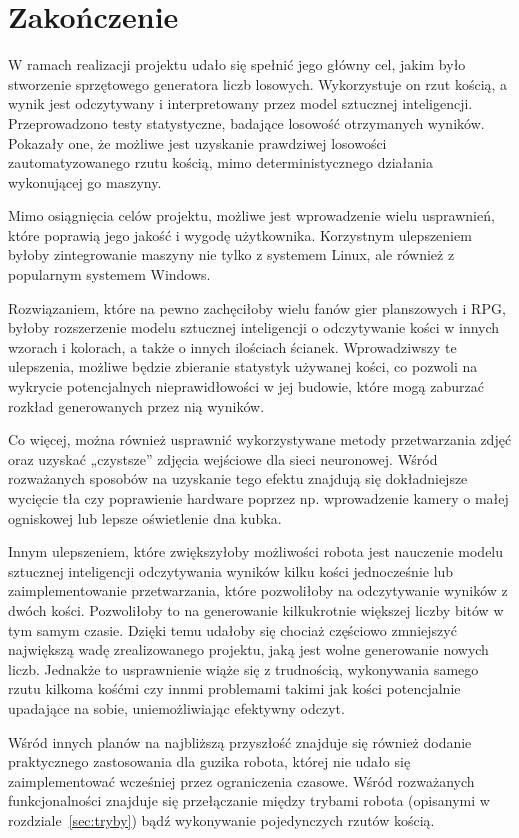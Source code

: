 
\chapter{Zakończenie}\label{ch:zakonczenie}

W ramach realizacji projektu udało się spełnić jego główny cel, jakim było stworzenie sprzętowego generatora liczb losowych.
Wykorzystuje on rzut kością, a wynik jest odczytywany i interpretowany przez model sztucznej inteligencji. Przeprowadzono
testy statystyczne, badające losowość otrzymanych wyników. Pokazały one, że możliwe jest uzyskanie prawdziwej losowości 
zautomatyzowanego rzutu kością, mimo deterministycznego działania wykonującej go maszyny.

Mimo osiągnięcia celów projektu, możliwe jest wprowadzenie wielu usprawnień, które poprawią jego jakość i wygodę użytkownika.
Korzystnym ulepszeniem byłoby zintegrowanie maszyny nie tylko z systemem Linux, ale również z popularnym systemem Windows.

Rozwiązaniem, które na pewno zachęciłoby wielu fanów gier planszowych i RPG, byłoby rozszerzenie modelu 
sztucznej inteligencji o odczytywanie kości w innych wzorach i kolorach, a także o innych ilościach ścianek.
Wprowadziwszy te ulepszenia, możliwe będzie zbieranie statystyk używanej kości, co pozwoli na wykrycie
potencjalnych nieprawidłowości w jej budowie, które mogą zaburzać rozkład generowanych przez nią wyników.

Co więcej, można również usprawnić wykorzystywane metody przetwarzania zdjęć oraz uzyskać
„czystsze” zdjęcia wejściowe dla sieci neuronowej. Wśród rozważanych sposobów na uzyskanie tego efektu znajdują się
dokładniejsze wycięcie tła czy poprawienie hardware poprzez np. wprowadzenie kamery o małej ogniskowej lub
lepsze oświetlenie dna kubka.

Innym ulepszeniem, które zwiększyłoby możliwości robota jest nauczenie modelu sztucznej inteligencji odczytywania
wyników kilku kości jednocześnie lub zaimplementowanie przetwarzania, które pozwoliłoby na odczytywanie wyników z dwóch kości.
Pozwoliłoby to na generowanie kilkukrotnie większej liczby bitów w tym samym czasie.
Dzięki temu udałoby się chociaż częściowo zmniejszyć największą wadę zrealizowanego projektu,
jaką jest wolne generowanie nowych liczb.
Jednakże to usprawnienie wiąże się z trudnością, wykonywania samego rzutu kilkoma kośćmi czy innmi problemami takimi jak kości potencjalnie 
upadające na sobie, uniemożliwiając efektywny odczyt.

Wśród innych planów na najbliższą przyszłość znajduje się również dodanie praktycznego zastosowania dla guzika robota,
której nie udało się zaimplementować wcześniej przez ograniczenia czasowe. Wśród rozważanych funkcjonalności znajduje się
przełączanie między trybami robota (opisanymi w rozdziale~\ref{sec:tryby}) bądź wykonywanie pojedynczych rzutów kością.

